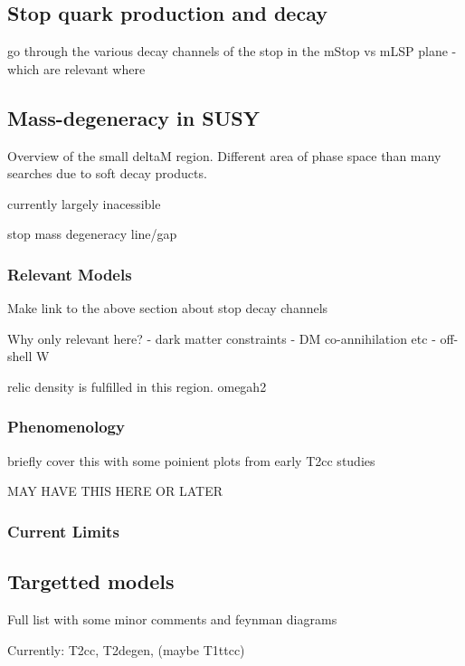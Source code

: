 \subsection{Stop quark production and decay}
go through the various decay channels of the stop in the mStop vs mLSP plane
- which are relevant where

\subsection{Mass-degeneracy in SUSY}
Overview of the small deltaM region. Different area of phase space than many searches due to soft decay 
products.

currently largely inacessible

stop mass degeneracy line/gap

\subsubsection{Relevant Models}
Make link to the above section about stop decay channels

Why only relevant here?
- dark matter constraints - DM co-annihilation etc
- off-shell W

relic density is fulfilled in this region. omegah2

\subsubsection{Phenomenology}
briefly cover this with some poinient plots from early T2cc studies

MAY HAVE THIS HERE OR LATER
\subsubsection{Current Limits}

\subsection{Targetted models}
Full list with some minor comments and feynman diagrams

Currently: T2cc, T2degen, (maybe T1ttcc)